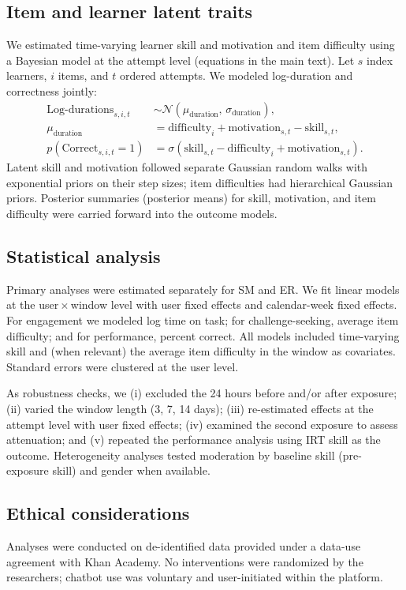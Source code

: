 \documentclass[11pt]{report}
\begin{document}
\begin{mainf}
\subsection*{Item and learner latent traits}
We estimated time-varying learner skill and motivation and item difficulty using a Bayesian model at the attempt level (equations in the main text).
Let \(s\) index learners, \(i\) items, and \(t\) ordered attempts. We modeled log-duration and correctness jointly:
\begin{align*}
    \text{Log-durations}_{s,i,t} &\sim \mathcal{N}(\mu_{\text{duration}}, \, \sigma_{\text{duration}}),\\
    \mu_{\text{duration}} &= \text{difficulty}_i + \text{motivation}_{s,t} - \text{skill}_{s,t},\\
    p(\text{Correct}_{s,i,t}=1) &= \sigma(\text{skill}_{s,t} - \text{difficulty}_i + \text{motivation}_{s,t}).
\end{align*}
Latent skill and motivation followed separate Gaussian random walks with exponential priors on their step sizes; item difficulties had hierarchical Gaussian priors. Posterior summaries (posterior means) for skill, motivation, and item difficulty were carried forward into the outcome models.

\subsection*{Statistical analysis}
Primary analyses were estimated separately for SM and ER.
We fit linear models at the user\,\(\times\,\)window level with user fixed effects and calendar-week fixed effects. For engagement we modeled log time on task; for challenge-seeking, average item difficulty; and for performance, percent correct. All models included time-varying skill and (when relevant) the average item difficulty in the window as covariates. Standard errors were clustered at the user level.

As robustness checks, we (i) excluded the 24 hours before and/or after exposure; (ii) varied the window length (3, 7, 14 days); (iii) re-estimated effects at the attempt level with user fixed effects; (iv) examined the second exposure to assess attenuation; and (v) repeated the performance analysis using IRT skill as the outcome.
Heterogeneity analyses tested moderation by baseline skill (pre-exposure skill) and gender when available.

\subsection*{Ethical considerations}
Analyses were conducted on de-identified data provided under a data-use agreement with Khan Academy.
No interventions were randomized by the researchers; chatbot use was voluntary and user-initiated within the platform.


\end{mainf}
\end{document}
